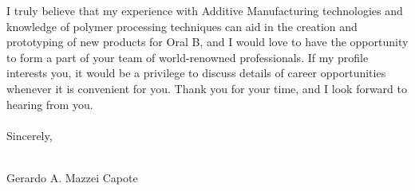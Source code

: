 \documentclass[12pt,letterpaper]{article}
\begin{document}
I truly believe that my experience with Additive Manufacturing technologies and knowledge of polymer processing techniques can aid in the creation and prototyping of new products for Oral B, and I would love to have the opportunity to form a part of your team of world-renowned professionals. If my profile interests you, it would be a privilege to discuss details of career opportunities whenever it is convenient for you. Thank you for your time, and I look forward to hearing from you.
\\
\\
Sincerely,
\\
\\
\begin{center}
Gerardo A. Mazzei Capote
\end{center}
\end{document}

